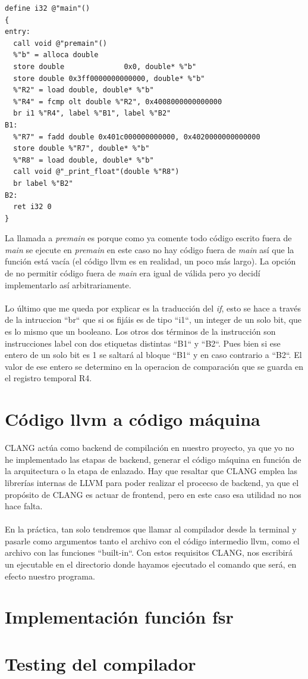 \begin{lstlisting}[style=pythonStyle]
define i32 @"main"()
{
entry:
  call void @"premain"()
  %"b" = alloca double
  store double              0x0, double* %"b"
  store double 0x3ff0000000000000, double* %"b"
  %"R2" = load double, double* %"b"
  %"R4" = fcmp olt double %"R2", 0x4008000000000000
  br i1 %"R4", label %"B1", label %"B2"
B1:
  %"R7" = fadd double 0x401c000000000000, 0x4020000000000000
  store double %"R7", double* %"b"
  %"R8" = load double, double* %"b"
  call void @"_print_float"(double %"R8")
  br label %"B2"
B2:
  ret i32 0
}
\end{lstlisting}
La llamada a \textit{premain} es porque como ya comente todo código escrito fuera de \textit{main} se ejecute en \textit{premain} en este caso no hay código fuera de \textit{main} así que la función está vacía (el código llvm es en realidad, un poco más largo). La opción de no permitir código fuera de \textit{main} era igual de válida pero yo decidí implementarlo así arbitrariamente. \\\\
Lo último que me queda por explicar es la traducción del \textit{if}, esto se hace a través de la intruccion ``br`` que si os fijáis es de tipo ``i1``, un integer de un solo bit, que es lo mismo que un booleano. Los otros dos términos de la instrucción son instrucciones label con dos etiquetas distintas ``B1`` y ``B2``. Pues bien si ese entero de un solo bit es 1 se saltará al bloque ``B1`` y en caso contrario a ``B2``. El valor de ese entero se determino en la operacion de comparación que se guarda en el registro temporal R4.

\section{Código llvm a código máquina}
CLANG actúa como backend de compilación en nuestro proyecto, ya que yo no he implementado las etapas de backend, generar el código máquina en función de la arquitectura o la etapa de enlazado. Hay que resaltar que CLANG emplea las librerías internas de LLVM para poder realizar el procecso de backend, ya que el propósito de CLANG es actuar de frontend, pero en este caso esa utilidad no nos hace falta. \\\\
En la práctica, tan solo tendremos que llamar al compilador desde la terminal y pasarle como argumentos tanto el archivo con el código intermedio llvm, como el archivo con las funciones ``built-in``. Con estos requisitos CLANG, nos escribirá un ejecutable en el directorio donde hayamos ejecutado el comando que será, en efecto nuestro programa.
\section{Implementación función fsr}

\section{Testing del compilador}


